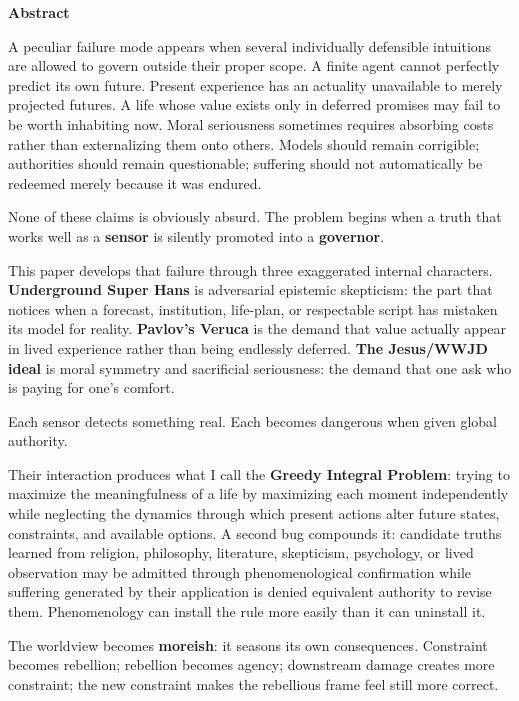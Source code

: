 \documentclass[10pt,letterpaper]{article}
\begin{document}
\begin{center}
\begin{minipage}{0.82\textwidth}
\begin{center}
\textbf{Abstract}
\end{center}
\justifying
A peculiar failure mode appears when several individually defensible
intuitions are allowed to govern outside their proper scope. A finite
agent cannot perfectly predict its own future. Present experience has an
actuality unavailable to merely projected futures. A life whose value
exists only in deferred promises may fail to be worth inhabiting now.
Moral seriousness sometimes requires absorbing costs rather than
externalizing them onto others. Models should remain corrigible;
authorities should remain questionable; suffering should not
automatically be redeemed merely because it was endured.

None of these claims is obviously absurd. The problem begins when a
truth that works well as a \textbf{sensor} is silently promoted into a
\textbf{governor}.

This paper develops that failure through three exaggerated internal
characters. \textbf{Underground Super Hans} is adversarial epistemic
skepticism: the part that notices when a forecast, institution,
life-plan, or respectable script has mistaken its model for reality.
\textbf{Pavlov's Veruca} is the demand that value actually appear in
lived experience rather than being endlessly deferred. \textbf{The
Jesus/WWJD ideal} is moral symmetry and sacrificial seriousness: the
demand that one ask who is paying for one's comfort.

Each sensor detects something real. Each becomes dangerous when given
global authority.

Their interaction produces what I call the \textbf{Greedy Integral
Problem}: trying to maximize the meaningfulness of a life by maximizing
each moment independently while neglecting the dynamics through which
present actions alter future states, constraints, and available options.
A second bug compounds it: candidate truths learned from religion,
philosophy, literature, skepticism, psychology, or lived observation may
be admitted through phenomenological confirmation while suffering
generated by their application is denied equivalent authority to revise
them. Phenomenology can install the rule more easily than it can
uninstall it.

The worldview becomes \textbf{moreish}: it seasons its own consequences.
Constraint becomes rebellion; rebellion becomes agency; downstream
damage creates more constraint; the new constraint makes the rebellious
frame feel still more correct.


\end{minipage}
\end{center}
\end{document}

